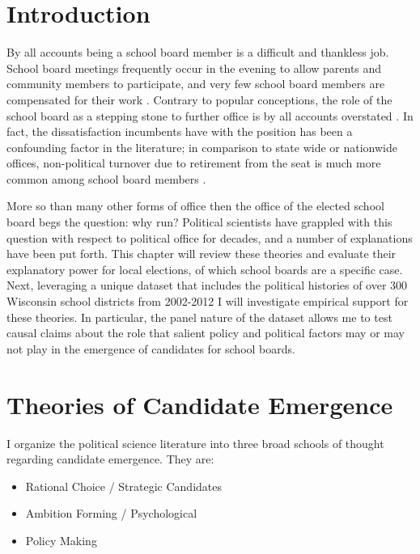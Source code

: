 
\section{Introduction}

By all accounts being a school board member is a difficult and thankless job. 
School board meetings frequently occur in the evening to allow parents and 
community members to participate, and very few school board members are 
compensated for their work \citep{RefWorks:333; RefWorks:321}. Contrary to popular conceptions, 
the role of the school board as a stepping stone to further office is by all 
accounts overstated \citep{RefWorks:321, RefWorks:322}. In fact, the dissatisfaction
incumbents have with the position has been a confounding factor in the literature; in 
comparison to state wide or nationwide offices, non-political turnover due to retirement 
from the seat is much more common among school board members \citep{RefWorks:311}. 


More so than many other forms of office then the office of the elected school 
board begs the question: why run? Political scientists have grappled with this 
question with respect to political office for decades, and a number of explanations 
have been put forth. This chapter will review these theories and evaluate their 
explanatory power for local elections, of which school boards are a specific case. 
Next, leveraging a unique dataset that includes the political 
histories of over 300 Wisconsin school districts from 2002-2012 I will investigate 
empirical support for these theories. In particular, the panel nature of the 
dataset allows me to test causal claims about the role that salient policy and 
political factors may or may not play in the emergence of candidates for school 
boards. 

\section{Theories of Candidate Emergence}

I organize the political science literature into three broad schools of thought 
regarding candidate emergence. They are:

\begin{itemize}
\item Rational Choice / Strategic Candidates
\item Ambition Forming / Psychological
\item Policy Making
\end{itemize}

